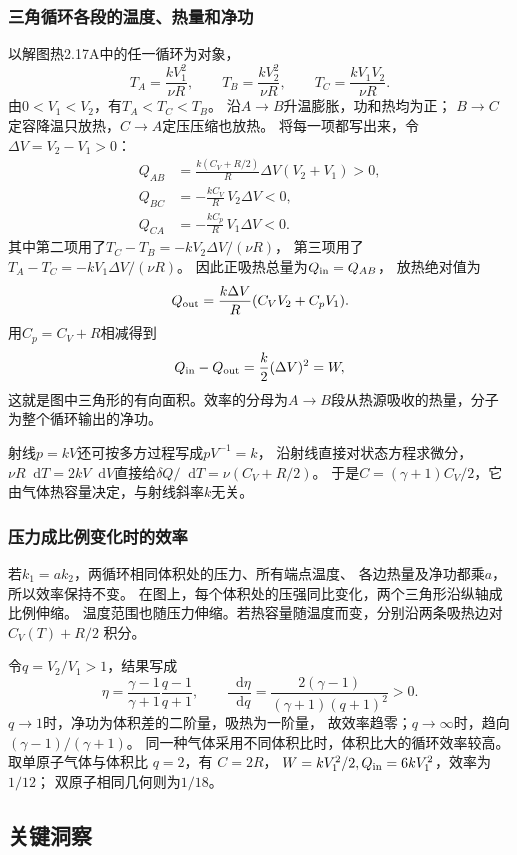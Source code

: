 \documentclass[UTF8,fontset=fandol,a4paper,11pt]{ctexart}
\newcommand{\dd}{\mathop{}\!\mathrm{d}}
\begin{document}
\subsubsection*{三角循环各段的温度、热量和净功}
以解图热2.17A中的任一循环为对象，
\[
T_A=\frac{kV_1^2}{\nu R},\qquad
T_B=\frac{kV_2^2}{\nu R},\qquad
T_C=\frac{kV_1V_2}{\nu R}.
\]
由$0<V_1<V_2$，有$T_A<T_C<T_B$。
沿$A\to B$升温膨胀，功和热均为正；
$B\to C$定容降温只放热，$C\to A$定压压缩也放热。
将每一项都写出来，令$\Delta V=V_2-V_1>0$：
\[
\begin{aligned}
Q_{AB}&=\frac{k(C_V+R/2)}R\Delta V(V_2+V_1)>0,\\
Q_{BC}&=-\frac{kC_V}R\,V_2\Delta V<0,\\
Q_{CA}&=-\frac{kC_p}R\,V_1\Delta V<0.
\end{aligned}
\]
其中第二项用了$T_C-T_B=-kV_2\Delta V/(\nu R)$，
第三项用了$T_A-T_C=-kV_1\Delta V/(\nu R)$。
因此正吸热总量为$Q_{\rm in}=Q_{AB}$，
放热绝对值为
\[
Q_{\rm out}=\frac{k\Delta V}R(C_VV_2+C_pV_1).
\]
用$C_p=C_V+R$相减得到
\[
Q_{\rm in}-Q_{\rm out}=\frac{k}{2}(\Delta V)^2=W,
\]
这就是图中三角形的有向面积。效率的分母为$A\to B$段从热源吸收的热量，分子为整个循环输出的净功。

射线$p=kV$还可按多方过程写成$pV^{-1}=k$，
沿射线直接对状态方程求微分，
$\nu R\dd T=2kV\dd V$直接给$\delta Q/\dd T=\nu(C_V+R/2)$。
于是$C=(\gamma+1)C_V/2$，它由气体热容量决定，与射线斜率$k$无关。

\subsubsection*{压力成比例变化时的效率}
若$k_1=a k_2$，两循环相同体积处的压力、所有端点温度、
各边热量及净功都乘$a$，所以效率保持不变。
在图上，每个体积处的压强同比变化，两个三角形沿纵轴成比例伸缩。
温度范围也随压力伸缩。若热容量随温度而变，分别沿两条吸热边对 $C_V(T)+R/2$ 积分。

令$q=V_2/V_1>1$，结果写成
\[
\eta=\frac{\gamma-1}{\gamma+1}\frac{q-1}{q+1},
\qquad
\frac{\dd\eta}{\dd q}
=\frac{2(\gamma-1)}{(\gamma+1)(q+1)^2}>0.
\]
$q\to1$时，净功为体积差的二阶量，吸热为一阶量，
故效率趋零；$q\to\infty$时，趋向$(\gamma-1)/(\gamma+1)$。
同一种气体采用不同体积比时，体积比大的循环效率较高。
取单原子气体与体积比 $q=2$，有 $C=2R$，
$W=kV_1^2/2,Q_{\rm in}=6kV_1^2$，效率为$1/12$；
双原子相同几何则为$1/18$。




\subsection*{关键洞察}
\end{document}
